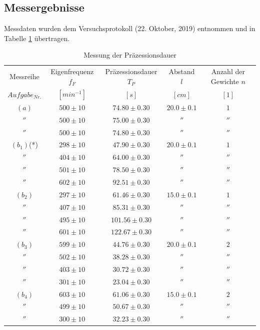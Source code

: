 \documentclass[a4paper,10pt]{article}
\begin{document}
\subsection{Messergebnisse}
Messdaten wurden dem Versuchsprotokoll (22. Oktober, 2019) entnommen und in Tabelle \ref{tab:Tab2} übertragen.
\unboldmath
\begin{table}[htb]
\centering
\caption{Messung der  Präzessionsdauer}\label{tab:Tab2}
\begin{threeparttable}
\begin{tabular}{ccccc}
\toprule
Messreihe & Eigenfrequenz \boldmath\(f_F\)\unboldmath & Präzessionsdauer \boldmath\(T_P\)\unboldmath  &Abstand \boldmath\(l\)\unboldmath & Anzahl der Gewichte  \boldmath\(n\)\unboldmath \\
\(Aufgabe_{Nr.}\)&\([min^{-1}]\)&\([s]\)&\([cm]\)&\([1]\)\\
\midrule
\((a)\)&\(500\pm10\)&\(74.80\pm0.30\)&\(20.0\pm0.1\)&\(1\)\\
\(''\)&\(500\pm10\)&\(75.00\pm0.30\)&\(''\)&\(''\)\\
\(''\)&\(500\pm10\)&\(74.80\pm0.30\)&\(''\)&\(''\)\\
\midrule
\((b_1)\)(*)&\(298\pm10\)&\(47.90\pm0.30\)&\(20.0\pm0.1\)&\(1\)\\
\(''\)&\(404\pm10\)&\(64.00\pm0.30\)&\(''\)&\(''\)\\
\(''\)&\(501\pm10\)&\(78.50\pm0.30\)&\(''\)&\(''\)\\
\(''\)&\(602\pm10\)&\(92.51\pm0.30\)&\(''\)&\(''\)\\
\midrule
\((b_2)\)&\(297\pm10\)&\(61.46\pm0.30\)&\(15.0\pm0.1\)&\(1\)\\
\(''\)&\(407\pm10\)&\(85.31\pm0.30\)&\(''\)&\(''\)\\
\(''\)&\(495\pm10\)&\(101.56\pm0.30\)&\(''\)&\(''\)\\
\(''\)&\(601\pm10\)&\(122.67\pm0.30\)&\(''\)&\(''\)\\
\midrule
\((b_3)\)&\(599\pm10\)&\(44.76\pm0.30\)&\(20.0\pm0.1\)&\(2\)\\
\(''\)&\(502\pm10\)&\(38.28\pm0.30\)&\(''\)&\(''\)\\
\(''\)&\(403\pm10\)&\(30.72\pm0.30\)&\(''\)&\(''\)\\
\(''\)&\(301\pm10\)&\(23.04\pm0.30\)&\(''\)&\(''\)\\
\midrule
\((b_4)\)&\(603\pm10\)&\(61.06\pm0.30\)&\(15.0\pm0.1\)&\(2\)\\
\(''\)&\(499\pm10\)&\(50.67\pm0.30\)&\(''\)&\(''\)\\
\(''\)&\(300\pm10\)&\(32.23\pm0.30\)&\(''\)&\(''\)\\

\end{tabular}
\end{threeparttable}
\end{table}
\end{document}
